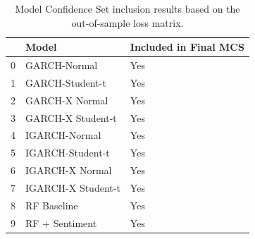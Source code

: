 \begin{table}
\caption{Model Confidence Set inclusion results based on the out-of-sample loss matrix.}
\label{tab:mcs_results}
\begin{tabular}{lll}
\toprule
 & Model & Included in Final MCS \\
\midrule
0 & GARCH-Normal & Yes \\
1 & GARCH-Student-t & Yes \\
2 & GARCH-X Normal & Yes \\
3 & GARCH-X Student-t & Yes \\
4 & IGARCH-Normal & Yes \\
5 & IGARCH-Student-t & Yes \\
6 & IGARCH-X Normal & Yes \\
7 & IGARCH-X Student-t & Yes \\
8 & RF Baseline & Yes \\
9 & RF + Sentiment & Yes \\
\bottomrule
\end{tabular}
\end{table}
